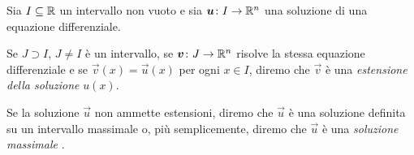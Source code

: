 \begin{definition}
Sia $I\subseteq {\mathbb R}$ un intervallo non vuoto e sia $\boldsymbol u \colon I \to {\mathbb R}^n$
una soluzione di una equazione differenziale.

Se $J\supset I$, $J \neq I$ è un intervallo, se $\boldsymbol v\colon J \to {\mathbb R}^n$
risolve la stessa equazione differenziale
e se $\vec v(x)=\vec u(x)$ per ogni $x\in I$,
diremo che $\vec v$ è una \emph{estensione della soluzione}%
 $u(x)$.

Se la soluzione $\vec u$ non ammette estensioni, diremo che $\vec u$ è una
soluzione definita su un intervallo massimale o, più semplicemente, diremo
che $\vec u$ è una \emph{soluzione massimale}%
.
\end{definition}

